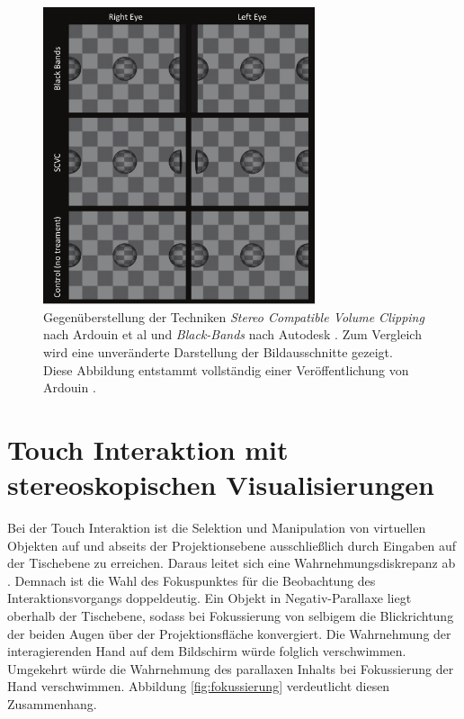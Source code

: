\begin{figure}
	\begin{center}
		\includegraphics[width=8cm]{img/black_bands_and_SCVC.pdf}
	\end{center}
	\caption{Gegenüberstellung der Techniken \emph{Stereo Compatible Volume Clipping} nach Ardouin et al \cite{ardouin:2011} und \emph{Black-Bands} nach Autodesk \cite{autodesk:2008}. Zum Vergleich wird eine unveränderte Darstellung der Bildausschnitte gezeigt. Diese Abbildung entstammt vollständig einer Veröffentlichung von Ardouin \cite{ardouin:2011}.}
	\label{fig:scvc}
\end{figure}


\section{Touch Interaktion mit stereoskopischen Visualisierungen}
\label{sec:related_touch_interaktion_stereo}

Bei der Touch Interaktion ist die Selektion und Manipulation von virtuellen Objekten auf und abseits der Projektionsebene ausschließlich durch Eingaben auf der Tischebene zu erreichen. Daraus leitet sich eine Wahrnehmungsdiskrepanz ab \cite{valkov:2011,bruder:2013}. Demnach ist die Wahl des Fokuspunktes für die Beobachtung des Interaktionsvorgangs doppeldeutig. Ein Objekt in Negativ-Parallaxe liegt oberhalb der Tischebene, sodass bei Fokussierung von selbigem die Blickrichtung der beiden Augen über der Projektionsfläche konvergiert. Die Wahrnehmung der interagierenden Hand auf dem Bildschirm würde folglich verschwimmen. Umgekehrt würde die Wahrnehmung des parallaxen Inhalts bei Fokussierung der Hand verschwimmen. Abbildung \ref{fig:fokussierung} verdeutlicht diesen Zusammenhang.

